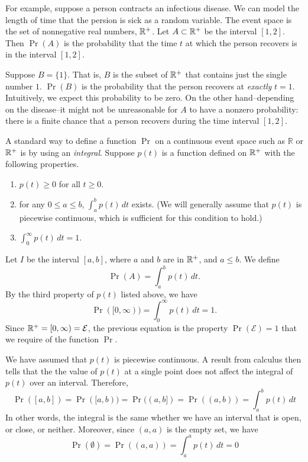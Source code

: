 For example, suppose a person contracts an
infectious disease. We can model the length
of time that the persion is sick as a random
variable.  The event space is the set of nonnegative
real numbers, $\mathbb{R}^{+}$.
Let $A \subset \mathbb{R}^{+}$ be the interval
$[1,2]$.
Then $\Pr(A)$ is the probability that the
time $t$ at which the person
recovers is in the interval $[1,2]$.

Suppose $B = \{1\}$.  That is, $B$ is the subset
of $\mathbb{R}^{+}$ that contains just the single
number $1$.
$\Pr(B)$ is the probability that the person
recovers at \emph{exactly} $t=1$.
Intuitively, we expect this probability to be zero.
On the other hand--depending on the disease--it
might not be unreasonable for $A$ to have a nonzero
probability: there is a finite chance that a person
recovers during the time interval $[1,2]$.

A standard way to define a function $\Pr$ on 
a continuous event space such as $\mathbb{R}$
or $\mathbb{R}^{+}$ is by using an
\emph{integral}.
Suppose $p(t)$ is a function defined on
$\mathbb{R}^{+}$ with the following properties.
\begin{enumerate}
\item $p(t) \ge 0$ for all $t \ge 0$.
\item for any $0 \le a \le b$,
$\int_a^b p(t)\,dt$ exists.
(We will generally assume that $p(t)$ is piecewise
continuous, which is sufficient for this condition to
hold.)
\item $\int_0^{\infty} p(t)\,dt = 1$.
\end{enumerate}
Let $I$ be the interval $[a,b]$, where $a$
and $b$ are in $\mathbb{R}^{+}$, and $a \le b$.
We define
\begin{equation}
  \Pr(A) = \int_a^b p(t)\,dt.
\end{equation}
By the third property of $p(t)$ listed above,
we have
\begin{equation}
  \Pr([0,\infty)) = \int_0^{\infty} p(t)\,dt = 1.
\end{equation}
Since $\mathbb{R}^{+} = [0,\infty) = \mathcal{E}$,
the previous equation
is the property $\Pr(\mathcal{E})=1$ that
we require of the function $\Pr$.

We have assumed that $p(t)$ is piecewise continuous.
A result from calculus then tells that the
the value of $p(t)$ at a single point does not
affect the integral of $p(t)$ over an interval.
Therefore,
\begin{equation}
  \Pr([a,b]) = \Pr([a,b)) = \Pr((a,b]) = \Pr((a,b))
   = \int_a^b p(t)\,dt
\end{equation}
In other words, the integral is the same whether
we have an interval that is open, or close, or neither.
Moreover, since $(a,a)$ is the empty set, we have
\begin{equation}
  \Pr(\emptyset) = \Pr((a,a))
     = \int_a^a p(t)\,dt = 0
\end{equation}

